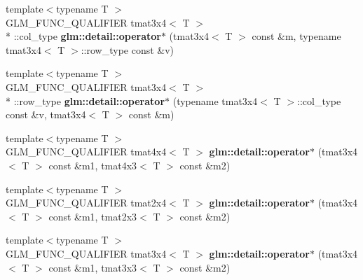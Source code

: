 \begin{DoxyCompactItemize}
\item 
\hypertarget{namespaceglm_1_1detail_afd29456121c1b2e36f6627eb8743f297}{{\footnotesize template$<$typename T $>$ }\\G\-L\-M\-\_\-\-F\-U\-N\-C\-\_\-\-Q\-U\-A\-L\-I\-F\-I\-E\-R tmat3x4$<$ T $>$\\*
\-::col\-\_\-type {\bfseries glm\-::detail\-::operator$\ast$} (tmat3x4$<$ T $>$ const \&m, typename tmat3x4$<$ T $>$\-::row\-\_\-type const \&v)}\label{namespaceglm_1_1detail_afd29456121c1b2e36f6627eb8743f297}

\item 
\hypertarget{namespaceglm_1_1detail_a063f3c5ccf946ef9136daa27baae5f1a}{{\footnotesize template$<$typename T $>$ }\\G\-L\-M\-\_\-\-F\-U\-N\-C\-\_\-\-Q\-U\-A\-L\-I\-F\-I\-E\-R tmat3x4$<$ T $>$\\*
\-::row\-\_\-type {\bfseries glm\-::detail\-::operator$\ast$} (typename tmat3x4$<$ T $>$\-::col\-\_\-type const \&v, tmat3x4$<$ T $>$ const \&m)}\label{namespaceglm_1_1detail_a063f3c5ccf946ef9136daa27baae5f1a}

\item 
\hypertarget{namespaceglm_1_1detail_a784b3075664afb40f6eecb4ae12cda1f}{{\footnotesize template$<$typename T $>$ }\\G\-L\-M\-\_\-\-F\-U\-N\-C\-\_\-\-Q\-U\-A\-L\-I\-F\-I\-E\-R tmat4x4$<$ T $>$ {\bfseries glm\-::detail\-::operator$\ast$} (tmat3x4$<$ T $>$ const \&m1, tmat4x3$<$ T $>$ const \&m2)}\label{namespaceglm_1_1detail_a784b3075664afb40f6eecb4ae12cda1f}

\item 
\hypertarget{namespaceglm_1_1detail_a7a8d0c55e1ed2c9d9c705224738da0d2}{{\footnotesize template$<$typename T $>$ }\\G\-L\-M\-\_\-\-F\-U\-N\-C\-\_\-\-Q\-U\-A\-L\-I\-F\-I\-E\-R tmat2x4$<$ T $>$ {\bfseries glm\-::detail\-::operator$\ast$} (tmat3x4$<$ T $>$ const \&m1, tmat2x3$<$ T $>$ const \&m2)}\label{namespaceglm_1_1detail_a7a8d0c55e1ed2c9d9c705224738da0d2}

\item 
\hypertarget{namespaceglm_1_1detail_a22bc5963c1f83e2d549abef9253f7fc4}{{\footnotesize template$<$typename T $>$ }\\G\-L\-M\-\_\-\-F\-U\-N\-C\-\_\-\-Q\-U\-A\-L\-I\-F\-I\-E\-R tmat3x4$<$ T $>$ {\bfseries glm\-::detail\-::operator$\ast$} (tmat3x4$<$ T $>$ const \&m1, tmat3x3$<$ T $>$ const \&m2)}\label{namespaceglm_1_1detail_a22bc5963c1f83e2d549abef9253f7fc4}


\end{DoxyCompactItemize}
